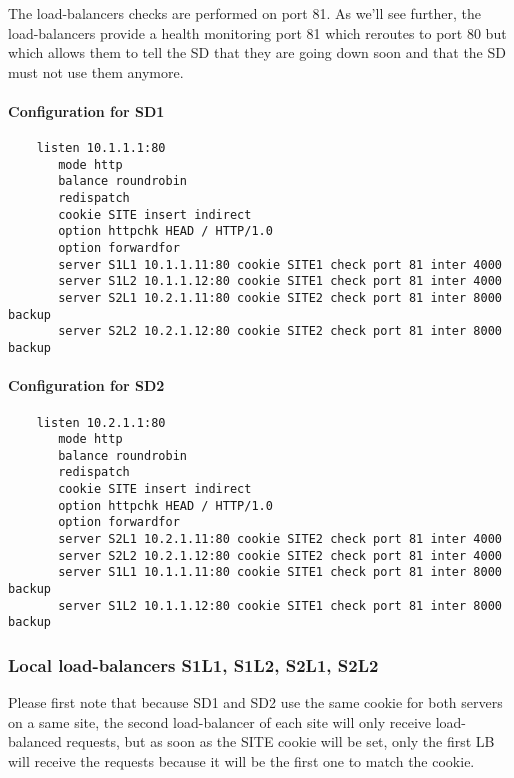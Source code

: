 The load-balancers checks are performed on port 81. As we'll see further,
the load-balancers provide a health monitoring port 81 which reroutes to
port 80 but which allows them to tell the SD that they are going down soon
and that the SD must not use them anymore.


\paragraph{Configuration for SD1}

\begin{verbatim}
    listen 10.1.1.1:80
       mode http
       balance roundrobin
       redispatch
       cookie SITE insert indirect
       option httpchk HEAD / HTTP/1.0
       option forwardfor
       server S1L1 10.1.1.11:80 cookie SITE1 check port 81 inter 4000
       server S1L2 10.1.1.12:80 cookie SITE1 check port 81 inter 4000
       server S2L1 10.2.1.11:80 cookie SITE2 check port 81 inter 8000 backup
       server S2L2 10.2.1.12:80 cookie SITE2 check port 81 inter 8000 backup
\end{verbatim}

\paragraph{Configuration for SD2}

\begin{verbatim}
    listen 10.2.1.1:80
       mode http
       balance roundrobin
       redispatch
       cookie SITE insert indirect
       option httpchk HEAD / HTTP/1.0
       option forwardfor
       server S2L1 10.2.1.11:80 cookie SITE2 check port 81 inter 4000
       server S2L2 10.2.1.12:80 cookie SITE2 check port 81 inter 4000
       server S1L1 10.1.1.11:80 cookie SITE1 check port 81 inter 8000 backup
       server S1L2 10.1.1.12:80 cookie SITE1 check port 81 inter 8000 backup
\end{verbatim}

\subsubsection{Local load-balancers S1L1, S1L2, S2L1, S2L2}

Please first note that because SD1 and SD2 use the same cookie for both
servers on a same site, the second load-balancer of each site will only
receive load-balanced requests, but as soon as the SITE cookie will be
set, only the first LB will receive the requests because it will be the
first one to match the cookie.

